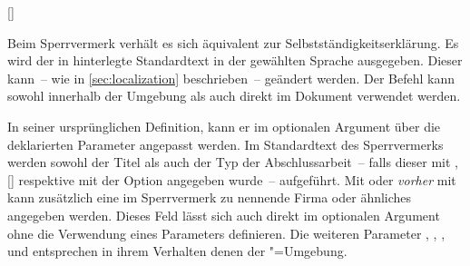 \begin{Declaration*}{}
\begin{Declaration*}{}
\begin{Declaration*}{}
\begin{Declaration}[v2.02]{[]}
\begin{Declaration}{}
\begin{Declaration}{}
\begin{Declaration}{}
\begin{Declaration}{}
\begin{Declaration}{}
\begin{Declaration}{}
\printdeclarationlist%
%
Beim Sperrvermerk verhält es sich äquivalent zur Selbstständigkeitserklärung.
Es wird der in  hinterlegte Standardtext in der gewählten 
Sprache ausgegeben. Dieser kann~-- wie in \autoref{sec:localization} 
beschrieben~-- geändert werden. Der Befehl  kann sowohl 
innerhalb der Umgebung  als auch direkt im Dokument 
verwendet werden. 

In seiner ursprünglichen Definition, kann er im optionalen Argument über die 
deklarierten Parameter angepasst werden. Im Standardtext des Sperrvermerks 
werden sowohl der Titel als auch der Typ der Abschlussarbeit~-- falls dieser 
mit , []
respektive mit der Option  angegeben wurde~-- aufgeführt. 
Mit  oder \emph{vorher} mit  kann 
zusätzlich eine im Sperrvermerk zu nennende Firma oder ähnliches angegeben 
werden. Dieses Feld lässt sich auch direkt im optionalen Argument ohne die 
Verwendung eines Parameters definieren. Die weiteren Parameter 
, 
, 
, 
 und 
 entsprechen in ihrem Verhalten denen 
der "=Umgebung.
\end{Declaration}
\end{Declaration}
\end{Declaration}
\end{Declaration}
\end{Declaration}
\end{Declaration}
\end{Declaration}


\end{Declaration*}
\end{Declaration*}
\end{Declaration*}
